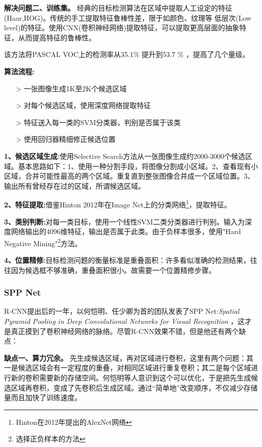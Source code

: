 \textbf{解决问题二、训练集。}
经典的目标检测算法在区域中提取人工设定的特征(Haar,HOG)。传统的手工提取特征鲁棒性差，限于如颜色、纹理等 低层次(Low level)的特征。使用CNN(卷积神经网络)提取特征，可以提取更高层面的抽象特征，从而提高特征的鲁棒性。

该方法将PASCAL VOC上的检测率从35.1\% 提升到53.7 \% ，提高了几个量级。

\textbf{算法流程:}

\line
\begin{itemize}
	\setlength{\itemsep}{0pt}
	\setlength{\parsep}{0pt}
	\setlength{\parskip}{0pt}
	\item[>] 一张图像生成1K至2K个候选区域
	\item[>] 对每个候选区域，使用深度网络提取特征
	\item[>] 特征送入每一类的SVM分类器，判别是否属于该类
	\item[>] 使用回归器精细修正候选位置	
\end{itemize}
\line

\textbf{1、候选区域生成:}使用Selective Search方法从一张图像生成约2000-3000个候选区域。基本思路如下：1、使用一种分割手段，将图像分割成小区域。2、查看现有小区域，合并可能性最高的两个区域。重复直到整张图像合并成一个区域位置。3、输出所有曾经存在过的区域，所谓候选区域。

\textbf{2、特征提取:}借鉴Hinton 2012年在Image Net上的分类网络\footnote{Hinton在2012年提出的AlexNet网络}，提取特征。

\textbf{3、类别判断:}对每一类目标，使用一个线性SVM二类分类器进行判别。输入为深度网络输出的4096维特征，输出是否属于此类。由于负样本很多，使用"Hard Negative Mining"\footnote{选择正负样本的方法}方法。

\textbf{4、位置精修:}目标检测问题的衡量标准是重叠面积：许多看似准确的检测结果，往往因为候选框不够准确，重叠面积很小。故需要一个位置精修步骤。 

\subsubsection{SPP Net}
R-CNN提出后的一年，以何恺明、任少卿为首的团队发表了SPP Net:\textit{Spatial Pyramid Pooling in Deep Convolutional Networks for Visual Recognition}\cite{sppnet} ，这才是真正摸到了卷积神经网络的脉络。尽管R-CNN效果不错，但是他还有两个缺点：

\textbf{缺点一、算力冗余。}
先生成候选区域，再对区域进行卷积，这里有两个问题：其一是候选区域会有一定程度的重叠，对相同区域进行重复卷积；其二是每个区域进行新的卷积需要新的存储空间。何恺明等人意识到这个可以优化，于是把先生成候选区域再卷积，变成了先卷积后生成区域。通过“简单地”改变顺序，不仅减少存储量而且加快了训练速度。

